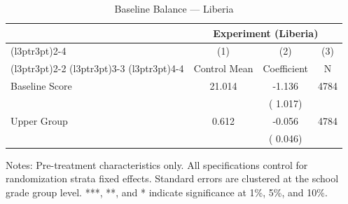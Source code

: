 \begin{table}[H]
\centering
\caption{Baseline Balance --- Liberia}
\label{tab:lib_balance}
\begin{threeparttable}
\begin{tabular}[t]{lccc}
\toprule
\multicolumn{1}{c}{ } & \multicolumn{3}{c}{Experiment (Liberia)} \\
\cmidrule(l{3pt}r{3pt}){2-4}
\multicolumn{1}{c}{ } & \multicolumn{1}{c}{(1)} & \multicolumn{1}{c}{(2)} & \multicolumn{1}{c}{(3)} \\
\cmidrule(l{3pt}r{3pt}){2-2} \cmidrule(l{3pt}r{3pt}){3-3} \cmidrule(l{3pt}r{3pt}){4-4}
 & Control Mean & Coefficient & N \\
\midrule
Baseline Score &  21.014 &  -1.136 & 4784 \\
 & & (  1.017) & \\
Upper Group &   0.612 &  -0.056 & 4784 \\
 & & (  0.046) & \\
\bottomrule
\end{tabular}
\begin{tablenotes}[para]
\item Notes: Pre-treatment characteristics only. All specifications control for randomization strata fixed effects. Standard errors are clustered at the school grade group level. ***, **, and * indicate significance at 1\%, 5\%, and 10\%.
\end{tablenotes}
\end{threeparttable}
\end{table}
